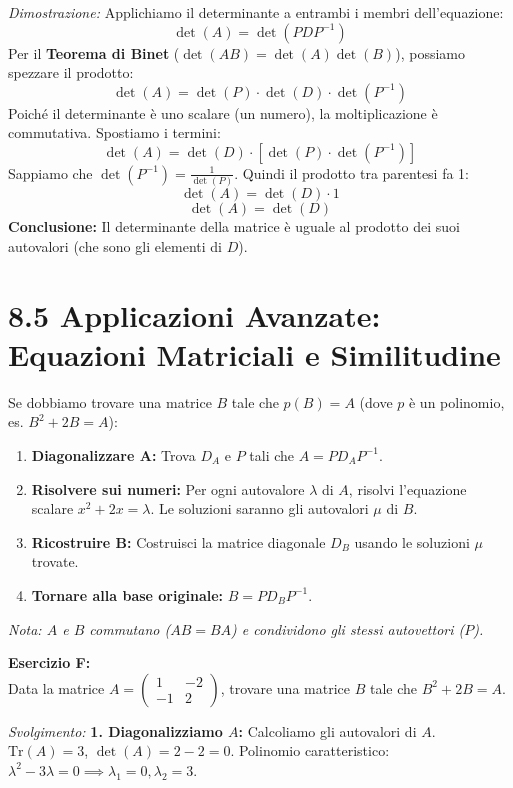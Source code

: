 \documentclass[10pt,a4paper]{article}
\begin{document}
\textit{Dimostrazione:}
Applichiamo il determinante a entrambi i membri dell'equazione:
\[ \det(A) = \det(P D P^{-1}) \]
Per il \textbf{Teorema di Binet} ($\det(AB) = \det(A)\det(B)$), possiamo spezzare il prodotto:
\[ \det(A) = \det(P) \cdot \det(D) \cdot \det(P^{-1}) \]
Poiché il determinante è uno scalare (un numero), la moltiplicazione è commutativa. Spostiamo i termini:
\[ \det(A) = \det(D) \cdot [\det(P) \cdot \det(P^{-1})] \]
Sappiamo che $\det(P^{-1}) = \frac{1}{\det(P)}$. Quindi il prodotto tra parentesi fa 1:
\[ \det(A) = \det(D) \cdot 1 \]
\[ \det(A) = \det(D) \]
\textbf{Conclusione:} Il determinante della matrice è uguale al prodotto dei suoi autovalori (che sono gli elementi di $D$).
\section*{8.5 Applicazioni Avanzate: Equazioni Matriciali e Similitudine}

\begin{tcolorbox}[colback=purple!5!white,colframe=purple!75!black,title=\textbf{Equazioni con la Diagonalizzazione}]
Se dobbiamo trovare una matrice $B$ tale che $p(B) = A$ (dove $p$ è un polinomio, es. $B^2+2B=A$):
\begin{enumerate}
    \item \textbf{Diagonalizzare A:} Trova $D_A$ e $P$ tali che $A = P D_A P^{-1}$.
    \item \textbf{Risolvere sui numeri:} Per ogni autovalore $\lambda$ di $A$, risolvi l'equazione scalare $x^2+2x = \lambda$. Le soluzioni saranno gli autovalori $\mu$ di $B$.
    \item \textbf{Ricostruire B:} Costruisci la matrice diagonale $D_B$ usando le soluzioni $\mu$ trovate.
    \item \textbf{Tornare alla base originale:} $B = P D_B P^{-1}$.
\end{enumerate}
\textit{Nota: $A$ e $B$ commutano ($AB=BA$) e condividono gli stessi autovettori ($P$).}
\end{tcolorbox}

\vspace{0.4cm}

\textbf{Esercizio F:}
\\ Data la matrice $A = \begin{pmatrix} 1 & -2 \\ -1 & 2 \end{pmatrix}$, trovare una matrice $B$ tale che $B^2 + 2B = A$.

\textit{Svolgimento:}
\textbf{1. Diagonalizziamo $A$:}
Calcoliamo gli autovalori di $A$.
$\text{Tr}(A) = 3$, $\det(A) = 2-2=0$.
Polinomio caratteristico: $\lambda^2 - 3\lambda = 0 \implies \lambda_1 = 0, \lambda_2 = 3$.
\end{document}
